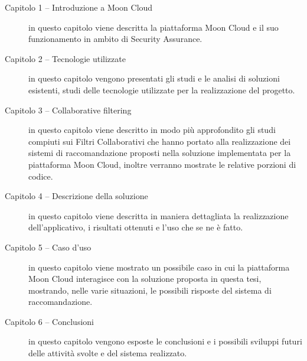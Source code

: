 \begin{description}
    \item[Capitolo 1 -- Introduzione a Moon Cloud] in questo capitolo viene descritta la piattaforma Moon Cloud e il suo funzionamento 
    in ambito di Security Assurance.
    \item[Capitolo 2 -- Tecnologie utilizzate] in questo capitolo vengono presentati gli studi e le analisi di soluzioni esistenti, 
    studi delle tecnologie utilizzate per la realizzazione del progetto.
    \item[Capitolo 3 -- Collaborative filtering] in questo capitolo viene descritto in modo più approfondito gli studi compiuti sui 
    Filtri Collaborativi che hanno portato alla realizzazione dei sistemi di raccomandazione proposti nella soluzione implementata 
    per la piattaforma Moon Cloud, inoltre verranno mostrate le relative porzioni di codice.
    \item[Capitolo 4 -- Descrizione della soluzione] in questo capitolo viene descritta in maniera dettagliata la realizzazione 
    dell'applicativo, i risultati ottenuti e l'uso che se ne è fatto.
    \item[Capitolo 5 -- Caso d'uso] in questo capitolo viene mostrato un possibile caso in cui la piattaforma Moon Cloud interagisce 
    con la soluzione proposta in questa tesi, mostrando, nelle varie situazioni, le possibili risposte del sistema di raccomandazione. 
    \item[Capitolo 6 -- Conclusioni] in questo capitolo vengono esposte le conclusioni e i possibili sviluppi futuri delle attività 
    svolte e del sistema realizzato.
\end{description}
